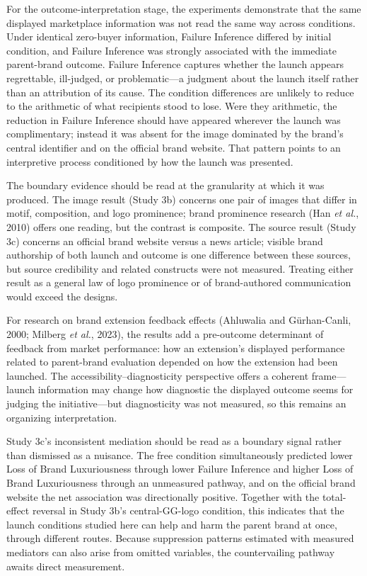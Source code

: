 \documentclass[12pt, a4paper]{article}
\begin{document}
For the outcome-interpretation stage, the experiments demonstrate that the same displayed marketplace information was not read the same way across conditions. Under identical zero-buyer information, Failure Inference differed by initial condition, and Failure Inference was strongly associated with the immediate parent-brand outcome. Failure Inference captures whether the launch appears regrettable, ill-judged, or problematic---a judgment about the launch itself rather than an attribution of its cause. The condition differences are unlikely to reduce to the arithmetic of what recipients stood to lose. Were they arithmetic, the reduction in Failure Inference should have appeared wherever the launch was complimentary; instead it was absent for the image dominated by the brand's central identifier and on the official brand website. That pattern points to an interpretive process conditioned by how the launch was presented.

The boundary evidence should be read at the granularity at which it was produced. The image result (Study 3b) concerns one pair of images that differ in motif, composition, and logo prominence; brand prominence research (Han \emph{et al.}, 2010) offers one reading, but the contrast is composite. The source result (Study 3c) concerns an official brand website versus a news article; visible brand authorship of both launch and outcome is one difference between these sources, but source credibility and related constructs were not measured. Treating either result as a general law of logo prominence or of brand-authored communication would exceed the designs.

For research on brand extension feedback effects (Ahluwalia and G\"urhan-Canli, 2000; Milberg \emph{et al.}, 2023), the results add a pre-outcome determinant of feedback from market performance: how an extension's displayed performance related to parent-brand evaluation depended on how the extension had been launched. The accessibility--diagnosticity perspective offers a coherent frame---launch information may change how diagnostic the displayed outcome seems for judging the initiative---but diagnosticity was not measured, so this remains an organizing interpretation.

Study 3c's inconsistent mediation should be read as a boundary signal rather than dismissed as a nuisance. The free condition simultaneously predicted lower Loss of Brand Luxuriousness through lower Failure Inference and higher Loss of Brand Luxuriousness through an unmeasured pathway, and on the official brand website the net association was directionally positive. Together with the total-effect reversal in Study 3b's central-GG-logo condition, this indicates that the launch conditions studied here can help and harm the parent brand at once, through different routes. Because suppression patterns estimated with measured mediators can also arise from omitted variables, the countervailing pathway awaits direct measurement.
\end{document}
